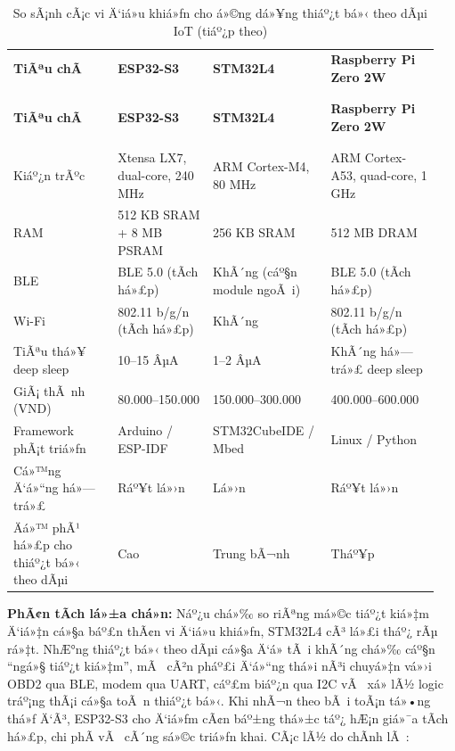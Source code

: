 \documentclass[a4paper]{extarticle}
\newcommand{\thesissettableid}[2]{%
  \renewcommand{\thetable}{#1}%
  \renewcommand{\theHtable}{#2}%
}
\begin{document}
{\thesissettableid{2.3}{tab-ch2-mcu-comparison-for-tracker}
\def\LTcaptype{table}
\begin{longtable}{|L{0.230\linewidth}|L{0.218\linewidth}|L{0.260\linewidth}|L{0.246\linewidth}|}
\caption{So sÃ¡nh cÃ¡c vi Ä‘iá»u khiá»ƒn cho á»©ng dá»¥ng thiáº¿t bá»‹ theo dÃµi IoT}\label{tab:ch2-mcu-comparison-for-tracker}\\
\hline \textbf{TiÃªu chÃ­} & \textbf{ESP32-S3} & \textbf{STM32L4} & \textbf{Raspberry Pi Zero 2W} \\
\\\hline
\endfirsthead
\caption[]{So sÃ¡nh cÃ¡c vi Ä‘iá»u khiá»ƒn cho á»©ng dá»¥ng thiáº¿t bá»‹ theo dÃµi IoT (tiáº¿p theo)}\\
\hline \textbf{TiÃªu chÃ­} & \textbf{ESP32-S3} & \textbf{STM32L4} & \textbf{Raspberry Pi Zero 2W} \\
\\\hline
\endhead
\\\hline
\endfoot
\endlastfoot
Kiáº¿n trÃºc & Xtensa LX7, dual-core, 240 MHz & ARM Cortex-M4, 80 MHz & ARM
Cortex-A53, quad-core, 1 GHz \\\hline
RAM & 512 KB SRAM + 8 MB PSRAM & 256 KB SRAM & 512 MB DRAM \\\hline
BLE & BLE 5.0 (tÃ­ch há»£p) & KhÃ´ng (cáº§n module ngoÃ i) & BLE 5.0 (tÃ­ch
há»£p) \\\hline
Wi-Fi & 802.11 b/g/n (tÃ­ch há»£p) & KhÃ´ng & 802.11 b/g/n (tÃ­ch há»£p) \\\hline
TiÃªu thá»¥ deep sleep & 10--15 ÂµA & 1--2 ÂµA & KhÃ´ng há»— trá»£ deep sleep \\\hline
GiÃ¡ thÃ nh (VND) & 80.000--150.000 & 150.000--300.000 &
400.000--600.000 \\\hline
Framework phÃ¡t triá»ƒn & Arduino / ESP-IDF & STM32CubeIDE / Mbed & Linux /
Python \\\hline
Cá»™ng Ä‘á»“ng há»— trá»£ & Ráº¥t lá»›n & Lá»›n & Ráº¥t lá»›n \\\hline
Äá»™ phÃ¹ há»£p cho thiáº¿t bá»‹ theo dÃµi & Cao & Trung bÃ¬nh & Tháº¥p \\\hline
\end{longtable}
}

\textbf{PhÃ¢n tÃ­ch lá»±a chá»n:} Náº¿u chá»‰ so riÃªng má»©c tiáº¿t kiá»‡m Ä‘iá»‡n cá»§a báº£n
thÃ¢n vi Ä‘iá»u khiá»ƒn, STM32L4 cÃ³ lá»£i tháº¿ rÃµ rá»‡t. NhÆ°ng thiáº¿t bá»‹ theo dÃµi cá»§a Ä‘á» tÃ i
khÃ´ng chá»‰ cáº§n ``ngá»§ tiáº¿t kiá»‡m'', mÃ  cÃ²n pháº£i Ä‘á»“ng thá»i nÃ³i chuyá»‡n vá»›i
OBD2 qua BLE, modem qua UART, cáº£m biáº¿n qua I2C vÃ  xá»­ lÃ½ logic tráº¡ng
thÃ¡i cá»§a toÃ n thiáº¿t bá»‹. Khi nhÃ¬n theo bÃ i toÃ¡n tá»•ng thá»ƒ Ä‘Ã³, ESP32-S3 cho
Ä‘iá»ƒm cÃ¢n báº±ng thá»±c táº¿ hÆ¡n giá»¯a tÃ­ch há»£p, chi phÃ­ vÃ  cÃ´ng sá»©c triá»ƒn khai.
CÃ¡c lÃ½ do chÃ­nh lÃ :
\end{document}
